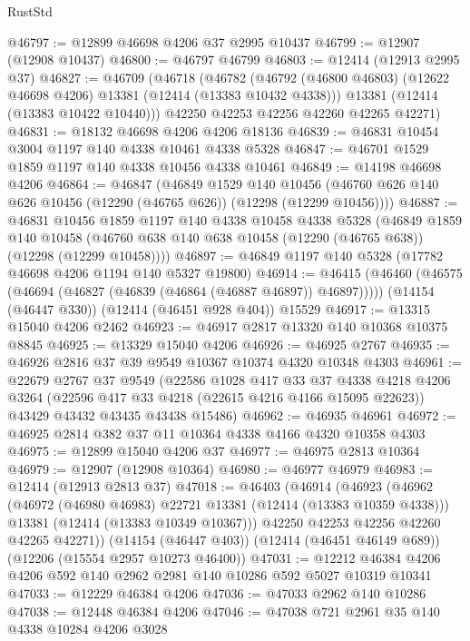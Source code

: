 \begin{lexlean}{RustStd}
\begin{coremodule}
{\begin{coremodule}
{{{{{{{{{{{{{{{{{{{{{{{{{{{{{{{{{{{{{{{{{{{{{{{{{{@46797 := @12899 @46698 @4206 @37 @2995 @10437
@46799 := @12907 (@12908 @10437)
@46800 := @46797 @46799
@46803 := @12414 (@12913 @2995 @37)
@46827 := @46709
    (@46718
      (@46782
        (@46792 (@46800 @46803) (@12622 @46698 @4206) @13381 (@12414 (@13383 @10432 @4338)))
        @13381
        (@12414 (@13383 @10422 @10440)))
      @42250
      @42253
      @42256
      @42260
      @42265
      @42271)
@46831 := @18132 @46698 @4206 @4206 @18136
@46839 := @46831 @10454 @3004 @1197 @140 @4338 @10461 @4338 @5328
@46847 := @46701 @1529 @1859 @1197 @140 @4338 @10456 @4338 @10461
@46849 := @14198 @46698 @4206
@46864 := @46847
    (@46849
      @1529
      @140
      @10456
      (@46760 @626 @140 @626 @10456 (@12290 (@46765 @626)) (@12298 (@12299 @10456))))
@46887 := @46831
    @10456
    @1859
    @1197
    @140
    @4338
    @10458
    @4338
    @5328
    (@46849
      @1859
      @140
      @10458
      (@46760 @638 @140 @638 @10458 (@12290 (@46765 @638)) (@12298 (@12299 @10458))))
@46897 := @46849 @1197 @140 @5328 (@17782 @46698 @4206 @1194 @140 @5327 @19800)
@46914 := @46415
    (@46460 (@46575 (@46694 (@46827 (@46839 (@46864 (@46887 @46897)) @46897)))))
    (@14154 (@46447 @330))
    (@12414 (@46451 @928 @404))
    @15529
@46917 := @13315 @15040 @4206 @2462
@46923 := @46917 @2817 @13320 @140 @10368 @10375 @8845
@46925 := @13329 @15040 @4206
@46926 := @46925 @2767
@46935 := @46926 @2816 @37 @39 @9549 @10367 @10374 @4320 @10348 @4303
@46961 := @22679
    @2767
    @37
    @9549
    (@22586
      @1028
      @417
      @33
      @37
      @4338
      @4218
      @4206
      @3264
      (@22596 @417 @33 @4218 (@22615 @4216 @4166 @15095 @22623))
      @43429
      @43432
      @43435
      @43438
      @15486)
@46962 := @46935 @46961
@46972 := @46925 @2814 @382 @37 @11 @10364 @4338 @4166 @4320 @10358 @4303
@46975 := @12899 @15040 @4206 @37
@46977 := @46975 @2813 @10364
@46979 := @12907 (@12908 @10364)
@46980 := @46977 @46979
@46983 := @12414 (@12913 @2813 @37)
@47018 := @46403
    (@46914
      (@46923
        (@46962
          (@46972 (@46980 @46983) @22721 @13381 (@12414 (@13383 @10359 @4338)))
          @13381
          (@12414 (@13383 @10349 @10367)))
        @42250
        @42253
        @42256
        @42260
        @42265
        @42271))
    (@14154 (@46447 @403))
    (@12414 (@46451 @46149 @689))
    (@12206 (@15554 @2957 @10273 @46400))
@47031 := @12212 @46384 @4206 @4206 @592 @140 @2962 @2981 @140 @10286 @592 @5027 @10319 @10341
@47033 := @12229 @46384 @4206
@47036 := @47033 @2962 @140 @10286
@47038 := @12448 @46384 @4206
@47046 := @47038 @721 @2961 @35 @140 @4338 @10284 @4206 @3028
}}}}}}}}}}}}}}}}}}}}}}}}}}}}}}}}}}}}}}}}}}}}}}}}}}
\end{coremodule}}
\end{coremodule}
\end{lexlean}
